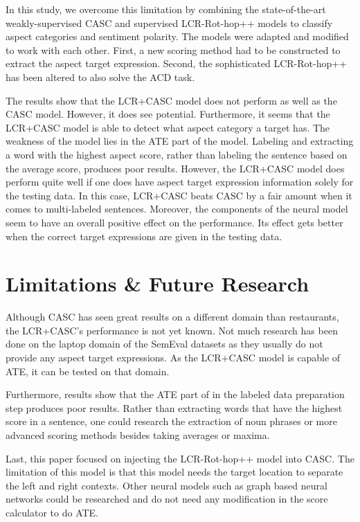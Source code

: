\documentclass[american, oneside]{ecsgdp}
\begin{document}
In this study, we overcome this limitation by combining the state-of-the-art weakly-supervised CASC \parencite{Kumar2021CASC} and supervised LCR-Rot-hop++ \parencite{Trusca2020HAABSA++} models to classify aspect categories and sentiment polarity. The models were adapted and modified to work with each other. First, a new scoring method had to be constructed to extract the aspect target expression. Second, the sophisticated LCR-Rot-hop++ has been altered to also solve the ACD task.

The results show that the LCR+CASC model does not perform as well as the CASC model. However, it does see potential. Furthermore, it seems that the LCR+CASC model is able to detect what aspect category a target has. The weakness of the model lies in the ATE part of the model. Labeling and extracting a word with the highest aspect score, rather than labeling the sentence based on the average score, produces poor results. However, the LCR+CASC model does perform quite well if one does have aspect target expression information solely for the testing data. In this case, LCR+CASC beats CASC by a fair amount when it comes to multi-labeled sentences. Moreover, the components of the neural model seem to have an overall positive effect on the performance. Its effect gets better when the correct target expressions are given in the testing data. 

\section{Limitations \& Future Research} \label{sec:limitation}
Although CASC has seen great results on a different domain than restaurants, the LCR+CASC's performance is not yet known. Not much research has been done on the laptop domain of the SemEval datasets as they usually do not provide any aspect target expressions. As the LCR+CASC model is capable of ATE, it can be tested on that domain. 

Furthermore, results show that the ATE part of in the labeled data preparation step produces poor results. Rather than extracting words that have the highest score in a sentence, one could research the extraction of noun phrases or more advanced scoring methods besides taking averages or maxima.

Last, this paper focused on injecting the LCR-Rot-hop++ model into CASC. The limitation of this model is that this model needs the target location to separate the left and right contexts. Other neural models such as graph based neural networks could be researched and do not need any modification in the score calculator to do ATE.



\backmatter
\printbibliography
% 
% 

\appendix
\end{document}
